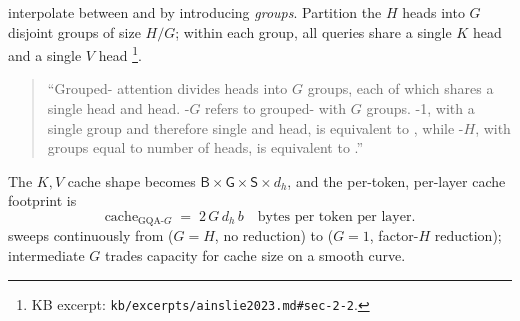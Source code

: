 \citet{ainslie2023} interpolate between  and  by introducing
\emph{groups}. Partition the $H$  heads into $G$ disjoint groups
of size $H/G$; within each group, all queries share a single $K$
head and a single $V$ head%
\footnote{KB excerpt: \texttt{kb/excerpts/ainslie2023.md\#sec-2-2}.}.
\begin{quote}
``Grouped- attention divides  heads into $G$ groups, each
of which shares a single  head and  head. -$G$ refers to
grouped- with $G$ groups. -1, with a single group and
therefore single  and  head, is equivalent to , while
-$H$, with groups equal to number of heads, is equivalent to .''
\citep[\S 2.2]{ainslie2023}
\end{quote}
The $K, V$ cache shape becomes
$\mathsf{B}\!\times\!\mathsf{G}\!\times\!\mathsf{S}\!\times\!d_h$, and
the per-token, per-layer cache footprint is
\begin{equation}
  \mathrm{cache}_{\mathrm{GQA\text{-}}G}
   \;=\; 2\,G\,d_h\,b
   \quad\text{bytes per token per layer}.
  \label{eq:gqa-cache}
\end{equation}
 sweeps continuously from  ($G = H$, no reduction) to 
($G = 1$, factor-$H$ reduction); intermediate $G$ trades capacity for
cache size on a smooth curve.

